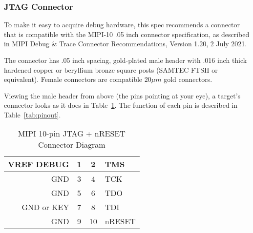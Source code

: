 \subsubsection{JTAG Connector}

To make it easy to acquire debug hardware, this spec recommends a connector
that is compatible with the MIPI-10 .05 inch connector specification, as described
in MIPI Debug \& Trace Connector Recommendations, Version 1.20, 2 July 2021.

The connector has .05 inch spacing, gold-plated male header with .016 inch thick
hardened copper or beryllium bronze square posts (SAMTEC FTSH or equivalent).
Female connectors are compatible $20\mu m$ gold connectors.

Viewing the male header from above (the pins pointing at your eye), a target's
connector looks as it does in Table~\ref{tab:mipiten}.  The function of each pin
is described in Table~\ref{tab:pinout}.

\begin{table}[H]
    \centering
    \caption{MIPI 10-pin JTAG + nRESET Connector Diagram}
    \label{tab:mipiten}
    \begin{tabular}{|r|c|c|l|}
        \hline
        VREF DEBUG & 1 & 2 & TMS \\
        \hline
        GND & 3 & 4 & TCK \\
        \hline
        GND & 5 & 6 & TDO \\
        \hline
        GND or KEY & 7 & 8 & TDI \\
        \hline
        GND & 9 & 10 & nRESET \\
        \hline
    \end{tabular}
\end{table}

